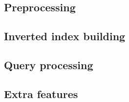 \subsection{Preprocessing}




\subsection{Inverted index building}



\subsection{Query processing}



\subsection{Extra features}